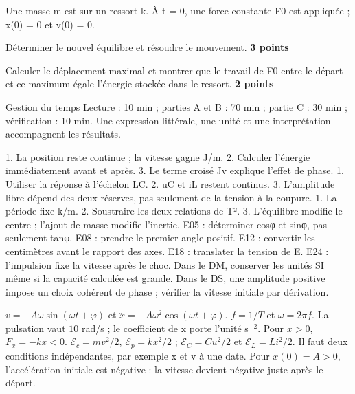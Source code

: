 Une masse m est sur un ressort k. À t = 0, une force constante F0 est appliquée ; x(0) = 0 et v(0) = 0.
\begin{questions}
\item Déterminer le nouvel équilibre et résoudre le mouvement. \textbf{3 points}
\item Calculer le déplacement maximal et montrer que le travail de F0 entre le départ et ce maximum égale l’énergie stockée dans le ressort. \textbf{2 points}
\end{questions}
\begin{docu}{Gestion du temps}
Lecture : 10 min ; parties A et B : 70 min ; partie C : 30 min ; vérification : 10 min. Une expression littérale, une unité et une interprétation accompagnent les résultats.
\end{docu}


1. La position reste continue ; la vitesse gagne J/m. 2. Calculer l’énergie immédiatement avant et après. 3. Le terme croisé Jv explique l’effet de phase.
1. Utiliser la réponse à l’échelon LC. 2. uC et iL restent continus. 3. L’amplitude libre dépend des deux réserves, pas seulement de la tension à la coupure.
1. La période fixe k/m. 2. Soustraire les deux relations de T². 3. L’équilibre modifie le centre ; l’ajout de masse modifie l’inertie.
E05 : déterminer cosφ et sinφ, pas seulement tanφ. E08 : prendre le premier angle positif. E12 : convertir les centimètres avant le rapport des axes. E18 : translater la tension de E. E24 : l’impulsion fixe la vitesse après le choc.
Dans le DM, conserver les unités SI même si la capacité calculée est grande. Dans le DS, une amplitude positive impose un choix cohérent de phase ; vérifier la vitesse initiale par dérivation.


$v=-A\omega\sin(\omega t+\varphi)$ et $\ddot x=-A\omega^2\cos(\omega t+\varphi)$. $f=1/T$ et $\omega=2\pi f$. La pulsation vaut $10$ rad/s ; le coefficient de x porte l’unité s$^{-2}$.
Pour $x>0$, $F_x=-kx<0$. $\mathcal E_c=mv^2/2$, $\mathcal E_p=kx^2/2$ ; $\mathcal E_C=Cu^2/2$ et $\mathcal E_L=Li^2/2$.
Il faut deux conditions indépendantes, par exemple x et v à une date. Pour $x(0)=A>0$, l’accélération initiale est négative : la vitesse devient négative juste après le départ.


